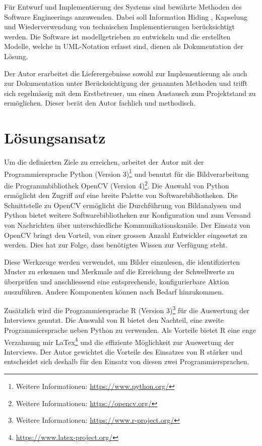 Für Entwurf und Implementierung des Systems sind bewährte Methoden des Software Engineerings anzuwenden. Dabei soll Information Hiding \citep[S. 764]{Sommerville2016}, Kapselung \citep[S. 150]{Deck2010} und Wiederverwendung von technischen Implementierungen \citep[S. 140]{Deck2010} berücksichtigt werden. Die Software ist modellgetrieben zu entwickeln und die erstellten Modelle, welche in UML-Notation erfasst sind, dienen als Dokumentation der Lösung.

Der Autor erarbeitet die Lieferergebnisse sowohl zur Implementierung als auch zur Dokumentation unter Berücksichtigung der genannten Methoden und trifft sich regelmässig mit dem Erstbetreuer, um einen Austausch zum Projektstand zu ermöglichen. Dieser berät den Autor fachlich und methodisch.

\section{Lösungsansatz}

Um die definierten Ziele zu erreichen, arbeitet der Autor mit der Programmiersprache Python (Version 3)\footnote{Weitere Informationen: \url{https://www.python.org/}} und benutzt für die Bildverarbeitung die Programmbibliothek OpenCV (Version 4)\footnote{Weitere Informationen: \url{https://opencv.org/}}. Die Auswahl von Python ermöglicht den Zugriff auf eine breite Palette von Softwarebibliotheken. Die Schnittstelle zu OpenCV ermöglicht die Durchführung von Bildanalysen und Python bietet weitere Softwarebibliotheken zur Konfiguration und zum Versand von Nachrichten über unterschiedliche Kommunikationskanäle. Der Einsatz von OpenCV bringt den Vorteil, von einer grossen Anzahl Entwickler eingesetzt zu werden. Dies hat zur Folge, dass benötigtes Wissen zur Verfügung steht. 

Diese Werkzeuge werden verwendet, um Bilder einzulesen, die identifizierten Muster zu erkennen und Merkmale auf die Erreichung der Schwellwerte zu überprüfen und anschliessend eine entsprechende, konfigurierbare Aktion auszuführen. Andere Komponenten können nach Bedarf hinzukommen.

Zusätzlich wird die Programmiersprache R (Version 3)\footnote{Weitere Informationen: \url{https://www.r-project.org/}} für die Auswertung der Interviews genutzt. Die Auswahl von R bietet den Nachteil, eine zweite Programmiersprache neben Python zu verwenden. Als Vorteile bietet R eine enge Verzahnung mir LaTex\footnote{\url{https://www.latex-project.org/}} und die effiziente Möglichkeit zur Auswertung der Interviews. Der Autor gewichtet die Vorteile des Einsatzes von R stärker und entscheidet sich deshalb für den Einsatz von diesen zwei Programmiersprachen.

